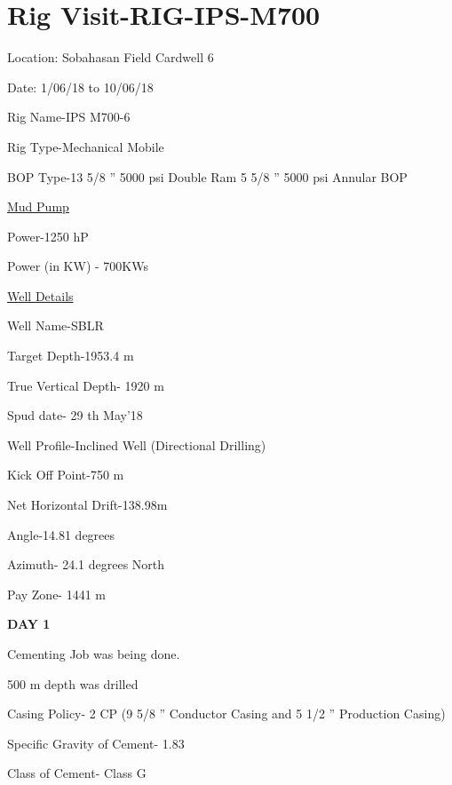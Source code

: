 \documentclass[11pt,a4paper]{article}
\makeatletter
\newcommand\mainmatter{%
    \cleardoublepage
  \pagenumbering{arabic}}
\makeatother
\begin{document}
\newpage


\listoftables


\newpage


\listoffigures


\newpage

\mainmatter

\newpage









\section{\textbf{Rig Visit-RIG-IPS-M700}}

Location: Sobahasan Field Cardwell 6

Date: 1/06/18 to 10/06/18

Rig Name-IPS M700-6

Rig Type-Mechanical Mobile

BOP Type-13 5/8 ” 5000 psi Double Ram \hfill 5 5/8 ” 5000 psi Annular BOP

\underline{Mud Pump}

Power-1250 hP

Power (in KW) - 700KWs

\underline{Well Details}

Well Name-SBLR

Target Depth-1953.4 m

True Vertical Depth- 1920 m

Spud date- 29 th May’18

Well Profile-Inclined Well (Directional Drilling)

Kick Off Point-750 m

Net Horizontal Drift-138.98m

Angle-14.81 degrees

Azimuth- 24.1 degrees North

Pay Zone- 1441 m

\textbf{DAY \hfill 1}

Cementing Job was being done.

500 m depth was drilled

Casing Policy- 2 CP (9 5/8 ” Conductor Casing and 5 1/2 ” Production Casing)

Specific Gravity of Cement- 1.83

Class of Cement- Class G
\end{document}
